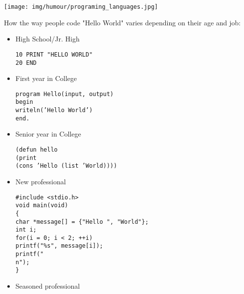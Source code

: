 	\begin{center}\underline{\hspace{5 cm}}\end{center}	
	
	\begin{center}
		\texttt{[image: img/humour/programing\_languages.jpg]}
	\end{center}
	
	How the way people code "Hello World" varies depending on their age and job:
	
	\begin{itemize}
		\item High School/Jr. High
	
	 \texttt{10 PRINT "HELLO WORLD"\\
	20 END}
	
		\item First year in College
	
	\texttt{program Hello(input, output)\\
	begin\\
	writeln('Hello World')\\
	end.}
	
		\item Senior year in College
		
	\texttt{(defun hello\\
	(print\\
	(cons 'Hello (list 'World))))}
	
		\item New professional
	
	\texttt{\#include <stdio.h>\\
	void main(void)\\
	\{\\
	char *message[] = \{"Hello ", "World"\};\\
	int i;\\
	for(i = 0; i < 2; ++i)\\
	printf("\%s", message[i]);\\
	printf("\\n");\\
	\}}
	
		\item Seasoned professional
		

\end{itemize}
